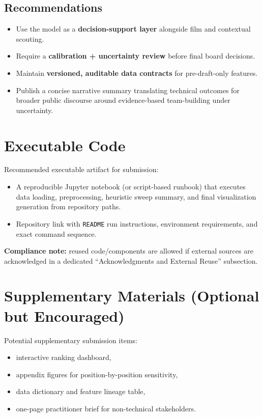 \documentclass[10pt]{article}
\begin{document}
\subsection{Recommendations}
\begin{itemize}
  \item Use the model as a \textbf{decision-support layer} alongside film and contextual scouting.
  \item Require a \textbf{calibration + uncertainty review} before final board decisions.
  \item Maintain \textbf{versioned, auditable data contracts} for pre-draft-only features.
  \item Publish a concise narrative summary translating technical outcomes for broader public discourse around evidence-based team-building under uncertainty.
\end{itemize}

\section{Executable Code}
Recommended executable artifact for submission:
\begin{itemize}
  \item A reproducible Jupyter notebook (or script-based runbook) that executes data loading, preprocessing, heuristic sweep summary, and final visualization generation from repository paths.
  \item Repository link with \texttt{README} run instructions, environment requirements, and exact command sequence.
\end{itemize}

\textbf{Compliance note:} reused code/components are allowed if external sources are acknowledged in a dedicated ``Acknowledgments and External Reuse'' subsection.

\section{Supplementary Materials (Optional but Encouraged)}
Potential supplementary submission items:
\begin{itemize}
  \item interactive ranking dashboard,
  \item appendix figures for position-by-position sensitivity,
  \item data dictionary and feature lineage table,
  \item one-page practitioner brief for non-technical stakeholders.
\end{itemize}
\end{document}
